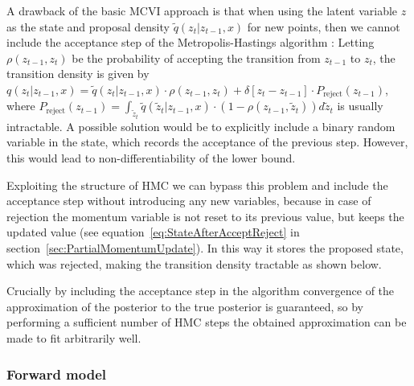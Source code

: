 A drawback of the basic MCVI approach is that when using the latent variable $z$ as the state and proposal density $\tilde{q}(z_t|z_{t-1}, x)$ for new points, then we cannot include the acceptance step of the Metropolis-Hastings algorithm \parencite{Salimans2014}: Letting $\rho(z_{t-1}, z_t)$ be the probability of accepting the transition from $z_{t-1}$ to $z_t$, the transition density is given by $q(z_t|z_{t-1}, x) = \tilde{q}(z_t|z_{t-1}, x) \cdot \rho(z_{t-1}, z_t) + \delta[z_t - z_{t-1}] \cdot P_\textrm{reject}(z_{t-1})$, where $P_\textrm{reject}(z_{t-1}) = \int_{\tilde{z}_{t}} \tilde{q}(\tilde{z}_t|z_{t-1}, x) \cdot (1 - \rho(z_{t-1}, \tilde{z}_t)) d\tilde{z}_t$ is usually intractable. A possible solution would be to explicitly include a binary random variable in the state, which records the acceptance of the previous step. However, this would lead to non-differentiability of the lower bound.

Exploiting the structure of HMC we can bypass this problem and include the acceptance step without introducing any new variables, because in case of rejection the momentum variable is not reset to its previous value, but keeps the updated value (see equation~\eqref{eq:StateAfterAcceptReject} in section~\ref{sec:PartialMomentumUpdate}). In this way it stores the proposed state, which was rejected, making the transition density tractable as shown below.

Crucially by including the acceptance step in the algorithm convergence of the approximation of the posterior to the true posterior is guaranteed, so by performing a sufficient number of HMC steps the obtained approximation can be made to fit arbitrarily well.

\subsubsection{Forward model}

